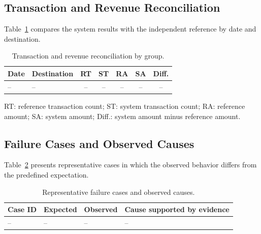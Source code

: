 \documentclass[runningheads]{llncs}
\begin{document}

\subsection{Transaction and Revenue Reconciliation}

Table~\ref{tab:reconciliation-results} compares the system results
with the independent reference by date and destination.

\begin{table}
\caption{Transaction and revenue reconciliation by group.}
\label{tab:reconciliation-results}
\centering
\begin{tabular}{|p{1.5cm}|p{1.8cm}|c|c|c|c|c|}
\hline
\textbf{Date} & \textbf{Destination} & \textbf{RT} & \textbf{ST}
& \textbf{RA} & \textbf{SA} & \textbf{Diff.} \\
\hline
-- & -- & -- & -- & -- & -- & -- \\
\hline
\end{tabular}

\smallskip
\parbox{0.9\textwidth}{\footnotesize
RT: reference transaction count; ST: system transaction count;
RA: reference amount; SA: system amount; Diff.: system amount
minus reference amount.}
\end{table}


\subsection{Failure Cases and Observed Causes}

Table~\ref{tab:failure-cases} presents representative cases in which
the observed behavior differs from the predefined expectation.

\begin{table}
\caption{Representative failure cases and observed causes.}
\label{tab:failure-cases}
\centering
\begin{tabular}{|p{1.5cm}|p{2.4cm}|p{2.4cm}|p{3.0cm}|}
\hline
\textbf{Case ID} & \textbf{Expected} & \textbf{Observed}
& \textbf{Cause supported by evidence} \\
\hline
-- & -- & -- & -- \\
\hline
\end{tabular}
\end{table}
\end{document}
